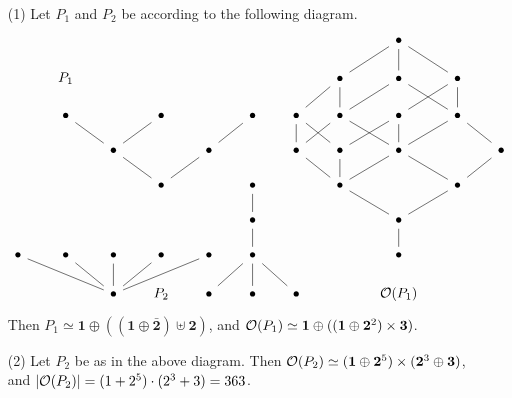 \begin{example}\label{example_1.14}
  \begin{enumerate}
    \item[(1)] Let $P_1$ and $P_2$ be according to the following
      diagram.
      \[\begin{tikzcd}[sep = scriptsize]
        &&&&&&&& \bullet \\
        & {P_1} &&&&&& \bullet & \bullet & \bullet \\
        & \bullet && \bullet && \bullet & \bullet & \bullet & \bullet & \bullet \\
        && \bullet && \bullet && \bullet & \bullet & \bullet && \bullet \\
        &&& \bullet && \bullet && \bullet && \bullet \\
        &&&&& \bullet &&& \bullet \\
        \bullet & \bullet & \bullet & \bullet & \bullet & \bullet &&& \bullet \\
        && \bullet & {P_2} & \bullet & \bullet & \bullet && {\Oc(P_1)}
        \arrow[no head, from=2-8, to=1-9]
        \arrow[no head, from=2-9, to=1-9]
        \arrow[no head, from=2-10, to=1-9]
        \arrow[no head, from=3-7, to=2-8]
        \arrow[no head, from=3-8, to=2-8]
        \arrow[no head, from=3-8, to=2-9]
        \arrow[no head, from=3-9, to=2-10]
        \arrow[no head, from=3-10, to=2-9]
        \arrow[no head, from=3-10, to=2-10]
        \arrow[no head, from=4-3, to=3-2]
        \arrow[no head, from=4-3, to=3-4]
        \arrow[no head, from=4-5, to=3-6]
        \arrow[no head, from=4-7, to=3-7]
        \arrow[no head, from=4-7, to=3-8]
        \arrow[no head, from=4-8, to=3-7]
        \arrow[no head, from=4-8, to=3-9]
        \arrow[no head, from=4-9, to=3-8]
        \arrow[no head, from=4-9, to=3-9]
        \arrow[no head, from=4-9, to=3-10]
        \arrow[no head, from=4-11, to=3-10]
        \arrow[no head, from=5-4, to=4-3]
        \arrow[no head, from=5-4, to=4-5]
        \arrow[no head, from=5-6, to=6-6]
        \arrow[no head, from=5-8, to=4-7]
        \arrow[no head, from=5-8, to=4-8]
        \arrow[no head, from=5-8, to=4-9]
        \arrow[no head, from=5-10, to=4-9]
        \arrow[no head, from=5-10, to=4-11]
        \arrow[no head, from=6-6, to=7-6]
        \arrow[no head, from=6-9, to=5-8]
        \arrow[no head, from=6-9, to=5-10]
        \arrow[no head, from=7-6, to=8-5]
        \arrow[no head, from=7-6, to=8-6]
        \arrow[no head, from=7-6, to=8-7]
        \arrow[no head, from=7-9, to=6-9]
        \arrow[no head, from=8-3, to=7-1]
        \arrow[no head, from=8-3, to=7-2]
        \arrow[no head, from=8-3, to=7-3]
        \arrow[no head, from=8-3, to=7-4]
        \arrow[no head, from=8-3, to=7-5]
      \end{tikzcd}\]
      Then $P_1 \simeq \mathbf{1} \oplus ((\mathbf{1} \oplus
      \bar{\mathbf{2}}) \uplus \mathbf{2})$, and $\mathcal{O}(P_1) \simeq
      \mathbf{1} \oplus ((\mathbf{1} \oplus \mathbf{2}^2) \times
      \mathbf{3})$.

    \item[(2)] Let $P_2$ be as in the above diagram. Then $\mathcal{O}(P_2)
      \simeq (\mathbf{1} \oplus \mathbf{2}^5) \times (\mathbf{2}^3
      \oplus \mathbf{3})$, and $|\mathcal{O}(P_2)|=(1+2^5) \cdot (2^3+3)=363$.
  \end{enumerate}
\end{example}
